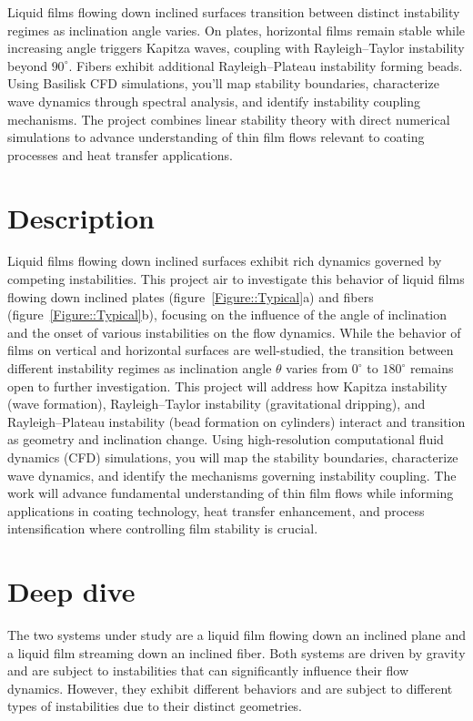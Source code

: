 \documentclass[11pt]{article}
\begin{document}
\begin{tcolorbox}[colback=mgray,colframe=mpurple,title=TL;DR]
    Liquid films flowing down inclined surfaces transition between distinct instability regimes as inclination angle varies. On plates, horizontal films remain stable while increasing angle triggers Kapitza waves, coupling with Rayleigh--Taylor instability beyond $90^\circ$. Fibers exhibit additional Rayleigh--Plateau instability forming beads. Using Basilisk CFD simulations, you'll map stability boundaries, characterize wave dynamics through spectral analysis, and identify instability coupling mechanisms. The project combines linear stability theory with direct numerical simulations to advance understanding of thin film flows relevant to coating processes and heat transfer applications.
\end{tcolorbox}

\section*{Description}

Liquid films flowing down inclined surfaces exhibit rich dynamics governed by competing instabilities. This project air to investigate this behavior of liquid films flowing down inclined plates (figure~\ref{Figure::Typical}a) and fibers  (figure~\ref{Figure::Typical}b), focusing on the influence of the angle of inclination and the onset of various instabilities on the flow dynamics. While the behavior of films on vertical and horizontal surfaces are well-studied, the transition between different instability regimes as inclination angle $\theta$ varies from $0^\circ$ to $180^\circ$ remains open to further investigation. This project will address how Kapitza instability (wave formation), Rayleigh--Taylor instability (gravitational dripping), and Rayleigh--Plateau instability (bead formation on cylinders) interact and transition as geometry and inclination change. Using high-resolution computational fluid dynamics (CFD) simulations, you will map the stability boundaries, characterize wave dynamics, and identify the mechanisms governing instability coupling. The work will advance fundamental understanding of thin film flows while informing applications in coating technology, heat transfer enhancement, and process intensification where controlling film stability is crucial.

\section*{Deep dive}
The two systems under study are a liquid film flowing down an inclined plane and a liquid film streaming down an inclined fiber. Both systems are driven by gravity and are subject to instabilities that can significantly influence their flow dynamics. However, they exhibit different behaviors and are subject to different types of instabilities due to their distinct geometries.
\end{document}
